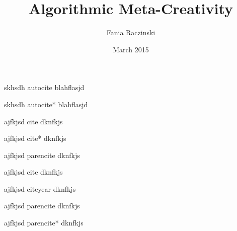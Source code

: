 \documentclass[11pt]{thesis} %
\title{Algorithmic Meta-Creativity}
\author{Fania Raczinski}
\date{March 2015}
\begin{document}
skhsdh autocite \autocite{Raczinski2016, Raczinski2013} blahflasjd \autocite{Hendler2011, Hendler2013} \autocite{Hugill2013a, Hugill2013c, Hugill2013d}

skhsdh autocite* \autocite*{Raczinski2016, Raczinski2013} blahflasjd \autocite*{Hendler2011, Hendler2013} \autocite*{Hugill2013a, Hugill2013c, Hugill2013d}

ajfkjsd cite \cite{Raczinski2016, Raczinski2013} dknfkjs \cite{Hendler2011, Hendler2013}

ajfkjsd cite* \cite*{Raczinski2016, Raczinski2013} dknfkjs \cite*{Hendler2011, Hendler2013}

ajfkjsd parencite \parencite{Raczinski2016, Raczinski2013} dknfkjs \parencite{Hendler2011, Hendler2013}

ajfkjsd cite \cite{Raczinski2016} dknfkjs

ajfkjsd citeyear \citeyear{Raczinski2016} dknfkjs

ajfkjsd parencite \parencite{Raczinski2016} dknfkjs


ajfkjsd parencite* \parencite*{Raczinski2016} dknfkjs

\printbibliography %
\end{document}
